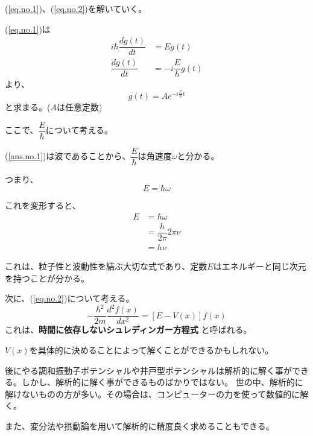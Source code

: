 (\ref{eq.no.1})、(\ref{eq.no.2})を解いていく。

(\ref{eq.no.1})は
\begin{align}
  i\hbar \dfrac{d g(t)}{d t} &= Eg(t) \\
  \dfrac{d g(t)}{d t} &= -i \dfrac{E}{\hbar} g(t)
\end{align}
より、
\begin{equation}
  \label{ans.no.1}
  \displaystyle g(t) = Ae^{-i \frac{E}{\hbar} t}
\end{equation}
と求まる。($A$は任意定数)

ここで、$\dfrac{E}{\hbar}$について考える。

(\ref{ans.no.1})は波であることから、$\dfrac{E}{\hbar}$は角速度$\omega$と分かる。

つまり、
\begin{equation}
  E = \hbar \omega
\end{equation}

これを変形すると、
\begin{align}
  E &= \hbar \omega \\
  &= \dfrac{h}{2\pi} 2\pi \nu \\
  &= h\nu
\end{align}

これは、粒子性と波動性を結ぶ大切な式であり、定数$E$はエネルギーと同じ次元を持つことが分かる。

次に、(\ref{eq.no.2})について考える。
\begin{equation*}
  \label{time_independent_schrodinger_eq}
  - \dfrac{\hbar^2}{2m} \dfrac{d^2 f(x)}{d x^2} = [ E-V(x) ]f(x)
\end{equation*}
これは、{\bf 時間に依存しないシュレディンガー方程式} と呼ばれる。

$V(x)$を具体的に決めることによって解くことができるかもしれない。

後にやる調和振動子ポテンシャルや井戸型ポテンシャルは解析的に解く事ができる。しかし、解析的に解く事ができるものばかりではない。
世の中、解析的に解けないものの方が多い。その場合は、コンピューターの力を使って数値的に解く。

また、変分法や摂動論を用いて解析的に精度良く求めることもできる。

